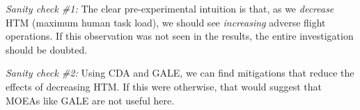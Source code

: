 \documentclass[journal]{IEEEtran}
\begin{document}
{\em Sanity check \#1:}
The clear pre-experimental intuition is that, as we 
{\em decrease}
HTM (maximum human task load), we should see {\em increasing} adverse flight operations. 
If this observation was not seen in the results, the entire investigation should be doubted.

{\em Sanity check \#2:} Using CDA and GALE, we can find mitigations that reduce the effects of decreasing HTM. 
If this were otherwise, that would suggest that MOEAs like GALE are not useful here.





\end{document}
